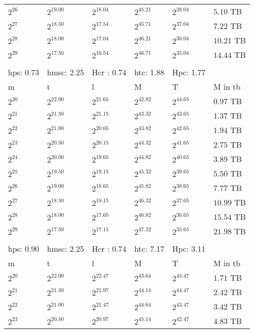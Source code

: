 \begin{tabular}{llllll}
$2^{26}$ & $2^{19.00}$ & $2^{18.04}$ & $2^{45.21}$ & $2^{38.04}$ & $5.10$ TB \\
$2^{27}$ & $2^{18.50}$ & $2^{17.54}$ & $2^{45.71}$ & $2^{37.04}$ & $7.22$ TB \\
$2^{28}$ & $2^{18.00}$ & $2^{17.04}$ & $2^{46.21}$ & $2^{36.04}$ & $10.21$ TB \\
$2^{29}$ & $2^{17.50}$ & $2^{16.54}$ & $2^{46.71}$ & $2^{35.04}$ & $14.44$ TB \\
 &  &  &  &  &  \\
hps: 0.73 & hmsc: 2.25 & Hcr : 0.74 & htc: 1.88 & Hpc: 1.77 &  \\
m & t & l & M & T & M in tb \\
$2^{20}$ & $2^{22.00}$ & $2^{21.65}$ & $2^{42.82}$ & $2^{44.65}$ & $0.97$ TB \\
$2^{21}$ & $2^{21.50}$ & $2^{21.15}$ & $2^{43.32}$ & $2^{43.65}$ & $1.37$ TB \\
$2^{22}$ & $2^{21.00}$ & $2^{20.65}$ & $2^{43.82}$ & $2^{42.65}$ & $1.94$ TB \\
$2^{23}$ & $2^{20.50}$ & $2^{20.15}$ & $2^{44.32}$ & $2^{41.65}$ & $2.75$ TB \\
$2^{24}$ & $2^{20.00}$ & $2^{19.65}$ & $2^{44.82}$ & $2^{40.65}$ & $3.89$ TB \\
$2^{25}$ & $2^{19.50}$ & $2^{19.15}$ & $2^{45.32}$ & $2^{39.65}$ & $5.50$ TB \\
$2^{26}$ & $2^{19.00}$ & $2^{18.65}$ & $2^{45.82}$ & $2^{38.65}$ & $7.77$ TB \\
$2^{27}$ & $2^{18.50}$ & $2^{18.15}$ & $2^{46.32}$ & $2^{37.65}$ & $10.99$ TB \\
$2^{28}$ & $2^{18.00}$ & $2^{17.65}$ & $2^{46.82}$ & $2^{36.65}$ & $15.54$ TB \\
$2^{29}$ & $2^{17.50}$ & $2^{17.15}$ & $2^{47.32}$ & $2^{35.65}$ & $21.98$ TB \\
 &  &  &  &  &  \\
hps: 0.90 & hmsc: 2.25 & Hcr : 0.74 & htc: 7.17 & Hpc: 3.11 &  \\
m & t & l & M & T & M in tb \\
$2^{20}$ & $2^{22.00}$ & $2^{22.47}$ & $2^{43.64}$ & $2^{45.47}$ & $1.71$ TB \\
$2^{21}$ & $2^{21.50}$ & $2^{21.97}$ & $2^{44.14}$ & $2^{44.47}$ & $2.42$ TB \\
$2^{22}$ & $2^{21.00}$ & $2^{21.47}$ & $2^{44.64}$ & $2^{43.47}$ & $3.42$ TB \\
$2^{23}$ & $2^{20.50}$ & $2^{20.97}$ & $2^{45.14}$ & $2^{42.47}$ & $4.83$ TB \\

\end{tabular}
